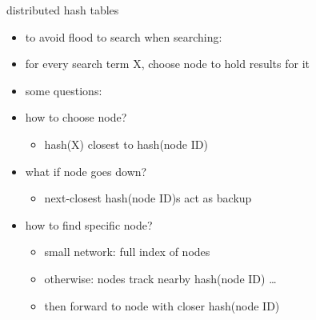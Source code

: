 \begin{frame}{distributed hash tables}
    \begin{itemize}
    \item to avoid flood to search when searching:
    \item for every search term X, choose node to hold results for it
    \item some questions:
    \vspace{.5cm}
    \item how to choose node?
        \begin{itemize}
        \item hash(X) closest to hash(node ID)
        \end{itemize}
    \item what if node goes down?
        \begin{itemize}
        \item next-closest hash(node ID)s act as backup
        \end{itemize}
    \item how to find specific node?
        \begin{itemize}
        \item small network: full index of nodes
        \item otherwise: nodes track nearby hash(node ID) \ldots
        \item then forward to node with closer hash(node ID)
        \end{itemize}
    \end{itemize}
\end{frame}
